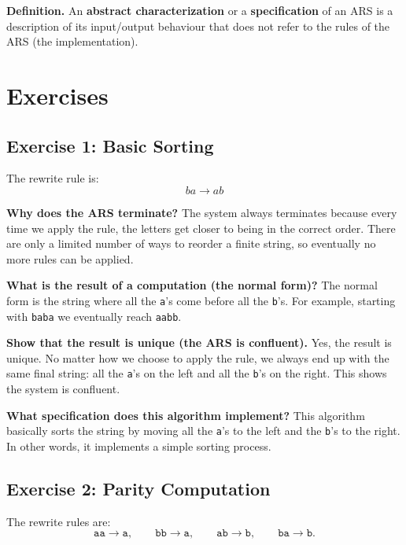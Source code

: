 \documentclass{article}
\theoremstyle{plain}
\theoremstyle{definition}
\theoremstyle{remark}
\begin{document}
\medskip

\textbf{Definition.} 
An \textbf{abstract characterization} or a \textbf{specification} of an ARS is a description of its input/output behaviour that does not refer to the rules of the ARS (the implementation). 

\section{Exercises}\label{exercises}

\subsection{Exercise 1: Basic Sorting}

The rewrite rule is:
\[
    ba \to ab
\]

\textbf{Why does the ARS terminate?}
The system always terminates because every time we apply the rule, the letters get closer to being in the correct order. There are only a limited number of ways to reorder a finite string, so eventually no more rules can be applied.

\textbf{What is the result of a computation (the normal form)?}
The normal form is the string where all the \texttt{a}'s come before all the \texttt{b}'s. For example, starting with \texttt{baba} we eventually reach \texttt{aabb}.

\textbf{Show that the result is unique (the ARS is confluent).}
Yes, the result is unique. No matter how we choose to apply the rule, we always end up with the same final string: all the \texttt{a}'s on the left and all the \texttt{b}'s on the right. This shows the system is confluent.

\textbf{What specification does this algorithm implement?}
This algorithm basically sorts the string by moving all the \texttt{a}'s to the left and the \texttt{b}'s to the right. In other words, it implements a simple sorting process.

\subsection{Exercise 2: Parity Computation}

The rewrite rules are:
\[
\texttt{aa} \to \texttt{a},\qquad
\texttt{bb} \to \texttt{a},\qquad
\texttt{ab} \to \texttt{b},\qquad
\texttt{ba} \to \texttt{b}.
\]
\end{document}
